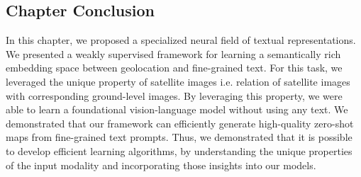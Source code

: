 \subsection{Chapter Conclusion}
In this chapter, we proposed a specialized neural field of textual representations. We presented a weakly supervised framework for learning a semantically rich embedding space between geolocation and fine-grained text. For this task, we leveraged the unique property of satellite images i.e. relation of satellite images with corresponding ground-level images. By leveraging this property, we were able to learn a foundational vision-language model without using any text. We demonstrated that our framework can efficiently generate high-quality zero-shot maps from fine-grained text prompts. Thus, we demonstrated that it is possible to develop efficient learning algorithms, by understanding the unique properties of the input modality and incorporating those insights into our models. 


